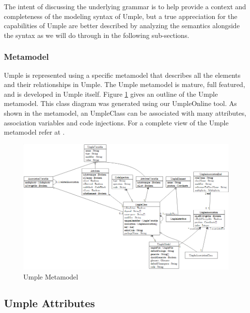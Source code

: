 The intent of discussing the underlying grammar is to help provide a context and completeness of the modeling syntax of Umple, but a true appreciation for the capabilities of Umple are better described by analyzing the semantics alongside the syntax as we will do through in the following sub-sections.

\subsubsection{Metamodel}
Umple is represented using a specific metamodel that describes all the elements and their relationships in Umple. The Umple metamodel is mature, full featured, and is developed in Umple itself. Figure \ref{fig:umpleMetamodel} gives an outline of the Umple metamodel. This class diagram was generated using our UmpleOnline tool. As shown in the metamodel, an UmpleClass can be associated with many attributes, association variables and code injections. For a complete view of the Umple metamodel refer at \cite{UmpleMetamodel}.

\begin{figure}[h]
\centering
\includegraphics[width=1\textwidth]{Figures/metamodelUmple.png} 
\caption{Umple Metamodel}
\label{fig:umpleMetamodel}
\end{figure}

\subsection{Umple Attributes}

